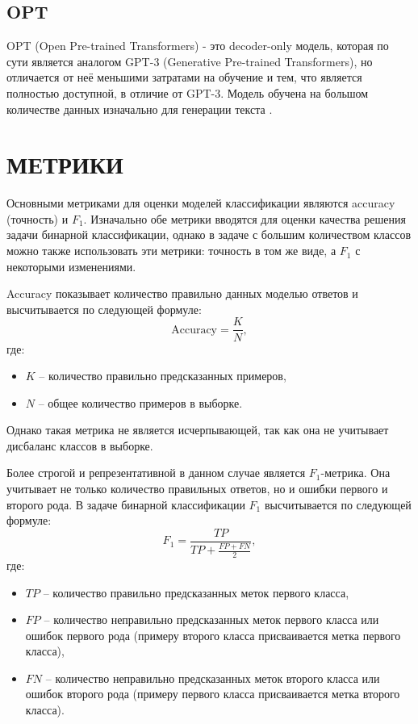 \subsection{OPT}
OPT (Open Pre-trained Transformers) - это decoder-only модель, которая по сути является аналогом GPT-3 (Generative Pre-trained Transformers), 
но отличается от неё меньшими затратами на обучение и тем, что является полностью доступной, в отличие от GPT-3. Модель обучена на большом 
количестве данных изначально для генерации текста \cite{opt}.

\section{МЕТРИКИ}
Основными метриками для оценки моделей классификации являются accuracy (точность) и $F_1$. Изначально обе метрики вводятся для оценки качества 
решения задачи бинарной классификации, однако в задаче с большим количеством классов можно также использовать эти метрики: точность в том же виде,
а $F_1$ с некоторыми изменениями.

Accuracy показывает количество правильно данных моделью ответов и высчитывается по следующей формуле:
\begin{equation}
    \text{Accuracy} = \frac{K}{N},
\end{equation}
где:
\begin{itemize}
    \item $K$ -- количество правильно предсказанных примеров,
    \item $N$ -- общее количество примеров в выборке.
\end{itemize}
Однако такая метрика не является исчерпывающей, так как она не учитывает дисбаланс классов в выборке.

Более строгой и репрезентативной в данном случае является $F_1$-метрика. Она учитывает не только количество правильных ответов, но и 
ошибки первого и второго рода. В задаче бинарной классификации $F_1$ высчитывается по следующей формуле:
\begin{equation}
    F_1 = \frac{TP}{TP + \frac{FP + FN}{2}},
\end{equation}
где:
\begin{itemize}
    \item $TP$ -- количество правильно предсказанных меток первого класса,
    \item $FP$ -- количество неправильно предсказанных меток первого класса или ошибок первого рода (примеру второго класса присваивается метка первого класса),
    \item $FN$ -- количество неправильно предсказанных меток второго класса или ошибок второго рода (примеру первого класса присваивается метка второго класса).
\end{itemize}

